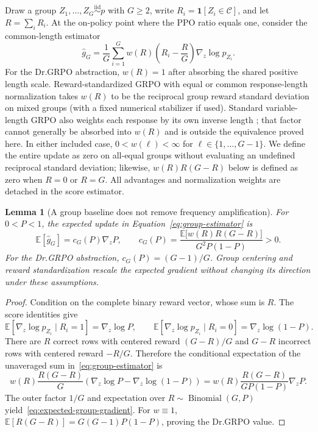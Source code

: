 \documentclass{article}
\newcommand{\1}{\mathbf 1}
\newcommand{\E}{\mathbb E}
\newtheorem{lemma}{Lemma}[section]
\theoremstyle{remark}
\theoremstyle{definition}
\theoremstyle{plain}
\begin{document}
Draw a group $Z_1,\ldots,Z_G\stackrel{\mathrm{iid}}{\sim}p$ with $G\ge2$,
write $R_i=\1[Z_i\in\mathcal C]$, and let $R=\sum_iR_i$. At the on-policy
point where the PPO ratio equals one, consider the common-length estimator
\begin{equation}
  \widehat g_G
  =\frac1G\sum_{i=1}^G
   w(R)\left(R_i-\frac{R}{G}\right)\nabla_z\log p_{Z_i}.
  \label{eq:group-estimator}
\end{equation}
For the Dr.GRPO abstraction, $w(R)=1$ after absorbing the shared positive
length scale. Reward-standardized GRPO with equal or common response-length
normalization takes $w(R)$ to be the reciprocal group reward standard
deviation on mixed groups (with a fixed numerical stabilizer if used).
Standard variable-length GRPO also weights each response by its own inverse
length \citep{shao2024deepseekmath,liu2025understanding}; that factor cannot
generally be absorbed into $w(R)$ and is outside the equivalence proved here.
In either included case, $0<w(\ell)<\infty$ for
$\ell\in\{1,\ldots,G-1\}$. We define the entire update as zero on all-equal
groups without evaluating an undefined reciprocal standard deviation;
likewise, $w(R)R(G-R)$ below is defined as zero when $R=0$ or $R=G$. All
advantages and normalization weights are detached in the score estimator.

\begin{lemma}[A group baseline does not remove frequency amplification]
\label{lem:grpo-mean}
For $0<P<1$, the expected update in Equation~\eqref{eq:group-estimator} is
\begin{equation}
  \E[\widehat g_G]
  =c_G(P)\nabla_z P,
  \qquad
  c_G(P)=
  \frac{\E\!\big[w(R)R(G-R)\big]}{G^2P(1-P)}>0.
  \label{eq:expected-group-gradient}
\end{equation}
For the Dr.GRPO abstraction, $c_G(P)=(G-1)/G$. Group centering and reward
standardization rescale the expected gradient without changing its direction
under these assumptions.
\end{lemma}

\begin{proof}
Condition on the complete binary reward vector, whose sum is $R$. The score
identities give
\[
  \E[\nabla_z\log p_{Z_i}\mid R_i=1]=\nabla_z\log P,
  \qquad
  \E[\nabla_z\log p_{Z_i}\mid R_i=0]
  =\nabla_z\log(1-P).
\]
There are $R$ correct rows with centered reward $(G-R)/G$ and $G-R$
incorrect rows with centered reward $-R/G$. Therefore the conditional
expectation of the unaveraged sum in~\eqref{eq:group-estimator} is
\[
  w(R)\frac{R(G-R)}{G}
  \left(\nabla_z\log P-\nabla_z\log(1-P)\right)
  =w(R)\frac{R(G-R)}{GP(1-P)}\nabla_zP.
\]
The outer factor $1/G$ and expectation over
$R\sim\operatorname{Binomial}(G,P)$ yield~\eqref{eq:expected-group-gradient}.
For $w\equiv1$,
$\E[R(G-R)]=G(G-1)P(1-P)$, proving the Dr.GRPO value.
\end{proof}
\end{document}

